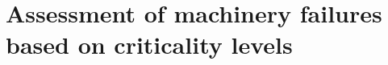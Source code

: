
\chapter{Assessment of machinery failures based on criticality levels}
\normalsize
\label{ch8}
\minitoc
\clearpage
